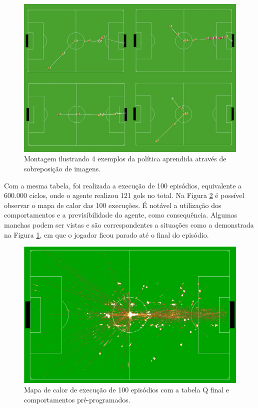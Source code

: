 \begin{figure}[H]
	\includegraphics[width=1\linewidth]{figs/behaviors-result.jpg}
	\centering
	\caption{Montagem ilustrando 4 exemplos da política aprendida através de sobreposição de imagens.}
	\label{fig:behaviors-result}
\end{figure}

Com a mesma tabela, foi realizada a execução de 100 episódios, equivalente a 600.000 ciclos, onde o agente realizou 121 gols no total. Na Figura \ref{fig:bhvheat} é possível observar o mapa de calor das 100 execuções. É notável a utilização dos comportamentos e a previsibilidade do agente, como consequência. Algumas manchas podem ser vistas e são correspondentes a situações como a demonstrada na Figura \ref{fig:behaviors-result}, em que o jogador ficou parado até o final do episódio.

\begin{figure}[H]
	\includegraphics[width=0.9\linewidth]{figs/behaviorsheat.png}
	\centering
	\caption{Mapa de calor de execução de 100 episódios com a tabela Q final e comportamentos pré-programados.}
	\label{fig:bhvheat}
\end{figure}


